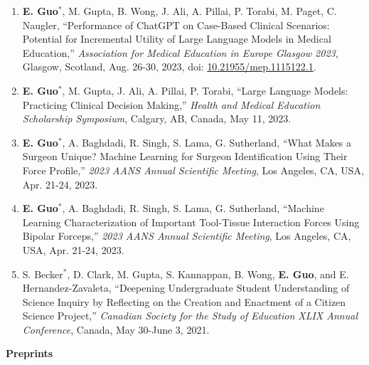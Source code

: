 \documentclass{article}
\begin{document}
\begin{enumerate}
    \item \textbf{E. Guo}$^*$, M. Gupta, B. Wong, J. Ali, A. Pillai, P. Torabi, M. Paget, C. Naugler, ``Performance of ChatGPT on Case-Based Clinical Scenarios: Potential for Incremental Utility of Large Language Models in Medical Education,'' \textit{Association for Medical Education in Europe Glasgow 2023}, Glasgow, Scotland, Aug. 26-30, 2023, doi: \href{https://doi.org/10.21955/mep.1115122.1}{10.21955/mep.1115122.1}.
    \item \textbf{E. Guo}$^*$, M. Gupta, J. Ali, A. Pillai, P. Torabi, ``Large Language Models: Practicing Clinical Decision Making,'' \textit{Health and Medical Education Scholarship Symposium}, Calgary, AB, Canada, May 11, 2023.
    \item \textbf{E. Guo}$^*$, A. Baghdadi, R. Singh, S. Lama, G. Sutherland, ``What Makes a Surgeon Unique? Machine Learning for Surgeon Identification Using Their Force Profile,'' \textit{2023 AANS Annual Scientific Meeting}, Los Angeles, CA, USA, Apr. 21-24, 2023.
    \item \textbf{E. Guo}$^*$, A. Baghdadi, R. Singh, S. Lama, G. Sutherland, ``Machine Learning Characterization of Important Tool-Tissue Interaction Forces Using Bipolar Forceps,'' \textit{2023 AANS Annual Scientific Meeting}, Los Angeles, CA, USA, Apr. 21-24, 2023.
    \item S. Becker$^*$, D. Clark, M. Gupta, S. Kannappan, B. Wong, \textbf{E. Guo}, and E. Hernandez-Zavaleta, ``Deepening Undergraduate Student Understanding of Science Inquiry by Reflecting on the Creation and Enactment of a Citizen Science Project,'' \textit{Canadian Society for the Study of Education XLIX Annual Conference}, Canada, May 30-June 3, 2021.
\end{enumerate} \vspace{1em}

\textbf{Preprints} \vspace{.5em}
\end{document}
